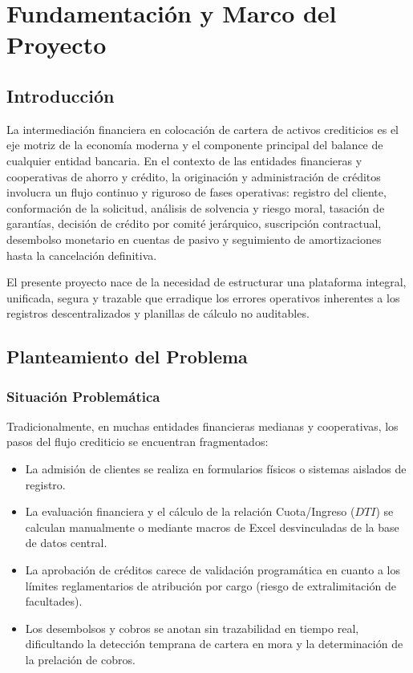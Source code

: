 \documentclass[11pt,letterpaper]{report}
\begin{document}
\chapter{Fundamentación y Marco del Proyecto}

\section{Introducción}
La intermediación financiera en colocación de cartera de activos crediticios es el eje motriz de la economía moderna y el componente principal del balance de cualquier entidad bancaria. En el contexto de las entidades financieras y cooperativas de ahorro y crédito, la originación y administración de créditos involucra un flujo continuo y riguroso de fases operativas: registro del cliente, conformación de la solicitud, análisis de solvencia y riesgo moral, tasación de garantías, decisión de crédito por comité jerárquico, suscripción contractual, desembolso monetario en cuentas de pasivo y seguimiento de amortizaciones hasta la cancelación definitiva.

El presente proyecto nace de la necesidad de estructurar una plataforma integral, unificada, segura y trazable que erradique los errores operativos inherentes a los registros descentralizados y planillas de cálculo no auditables.

\section{Planteamiento del Problema}
\subsection{Situación Problemática}
Tradicionalmente, en muchas entidades financieras medianas y cooperativas, los pasos del flujo crediticio se encuentran fragmentados:
\begin{itemize}
    \item La admisión de clientes se realiza en formularios físicos o sistemas aislados de registro.
    \item La evaluación financiera y el cálculo de la relación Cuota/Ingreso ($DTI$) se calculan manualmente o mediante macros de Excel desvinculadas de la base de datos central.
    \item La aprobación de créditos carece de validación programática en cuanto a los límites reglamentarios de atribución por cargo (riesgo de extralimitación de facultades).
    \item Los desembolsos y cobros se anotan sin trazabilidad en tiempo real, dificultando la detección temprana de cartera en mora y la determinación de la prelación de cobros.
\end{itemize}
\end{document}
